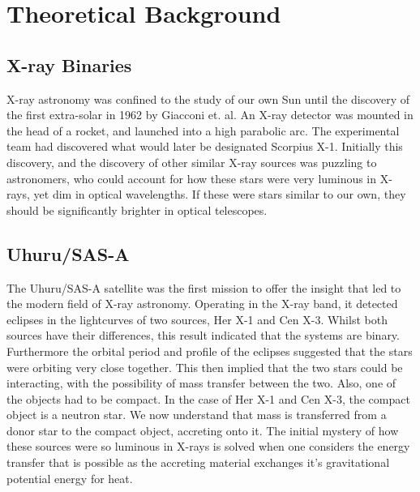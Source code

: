
\chapter{Theoretical Background} %

\label{ch:theoretical} %


\section{X-ray Binaries}
X-ray astronomy was confined to the study of our own Sun until the discovery of the first extra-solar in 1962 by Giacconi et. al. An X-ray detector was mounted in the head of a rocket, and launched into a high parabolic arc. The experimental team had discovered what would later be designated Scorpius X-1. Initially this discovery, and the discovery of other similar X-ray sources was puzzling to astronomers, who could account for how these stars were very luminous in X-rays, yet dim in optical wavelengths. If these were stars similar to our own, they should be significantly brighter in optical telescopes. 

\section{Uhuru/SAS-A}
The Uhuru/SAS-A satellite was the first mission to offer the insight that led to the modern field of X-ray astronomy. Operating in the X-ray band, it detected eclipses in the lightcurves of two sources, Her X-1 and Cen X-3. Whilst both sources have their differences, this result indicated that the systems are binary. Furthermore the orbital period and profile of the eclipses suggested that the stars were orbiting very close together. This then implied that the two stars could be interacting, with the possibility of mass transfer between the two. Also, one of the objects had to be compact. In the case of Her X-1 and Cen X-3, the compact object is a neutron star. We now understand that mass is transferred from a donor star to the compact object, accreting onto it. The initial mystery of how these sources were so luminous in X-rays is solved when one considers the energy transfer that is possible as the accreting material exchanges it\textquoteright{}s gravitational potential energy for heat. 

